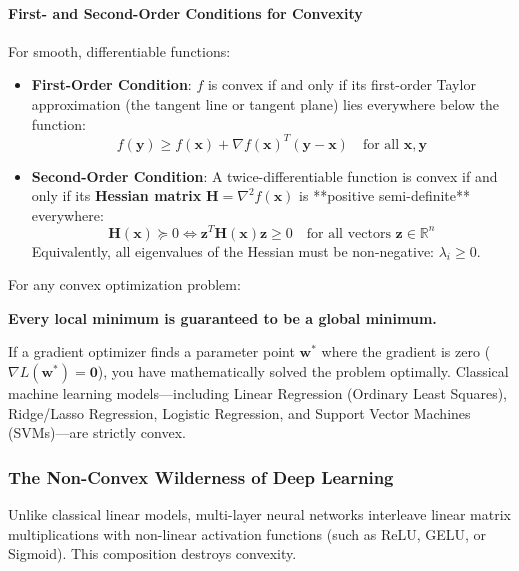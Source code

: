\paragraph{First- and Second-Order Conditions for Convexity}
For smooth, differentiable functions:
\begin{itemize}
    \item \textbf{First-Order Condition}: $f$ is convex if and only if its first-order Taylor approximation (the tangent line or tangent plane) lies everywhere below the function:
    \begin{equation}
    f(\mathbf{y}) \ge f(\mathbf{x}) + \nabla f(\mathbf{x})^T (\mathbf{y} - \mathbf{x}) \quad \text{for all } \mathbf{x}, \mathbf{y}\label{eq:first_order_convex}
    \end{equation}
    \item \textbf{Second-Order Condition}: A twice-differentiable function is convex if and only if its \textbf{Hessian matrix} $\mathbf{H} = \nabla^2 f(\mathbf{x})$ is **positive semi-definite** everywhere:
    \begin{equation}
    \mathbf{H}(\mathbf{x}) \succeq 0 \iff \mathbf{z}^T \mathbf{H}(\mathbf{x}) \mathbf{z} \ge 0 \quad \text{for all vectors } \mathbf{z} \in \mathbb{R}^n\label{eq:second_order_convex}
    \end{equation}
    Equivalently, all eigenvalues of the Hessian must be non-negative: $\lambda_i \ge 0$.
\end{itemize}

\begin{keyidea}
For any convex optimization problem:
\begin{center}
\textbf{Every local minimum is guaranteed to be a global minimum.}
\end{center}
If a gradient optimizer finds a parameter point $\mathbf{w}^*$ where the gradient is zero ($\nabla L(\mathbf{w}^*) = \mathbf{0}$), you have mathematically solved the problem optimally. Classical machine learning models---including Linear Regression (Ordinary Least Squares), Ridge/Lasso Regression, Logistic Regression, and Support Vector Machines (SVMs)---are strictly convex.
\end{keyidea}

\subsubsection{The Non-Convex Wilderness of Deep Learning}
Unlike classical linear models, multi-layer neural networks interleave linear matrix multiplications with non-linear activation functions (such as ReLU, GELU, or Sigmoid). This composition destroys convexity.

